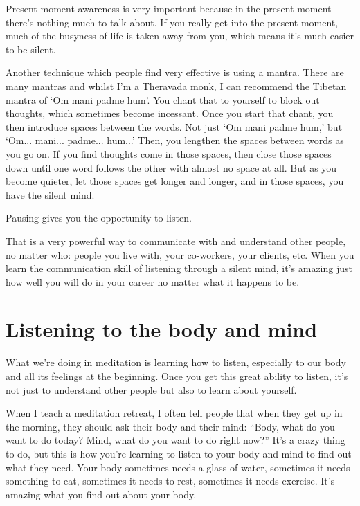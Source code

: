 \documentclass[12pt, openany]{book}
\newenvironment{aphorism}%
{%
\begin{center}\begin{itshape}
}%
{\end{itshape}\end{center}
}%
\begin{document}
Present moment awareness is very important because in the present moment there’s nothing much to talk about. If you really get into the present moment, much of the busyness of life is taken away from you, which means it’s much easier to be silent. 

Another technique which people find very effective is using a mantra. There are many mantras and whilst I’m a Theravada monk, I can recommend the Tibetan mantra of ‘Om mani padme hum’. You chant that to yourself to block out thoughts, which sometimes become incessant. Once you start that chant, you then introduce spaces between the words. Not just ‘Om mani padme hum,’ but ‘Om... mani... padme... hum...’ Then, you lengthen the spaces between words as you go on. If you find thoughts come in those spaces, then close those spaces down until one word follows the other with almost no space at all. But as you become quieter, let those spaces get longer and longer, and in those spaces, you have the silent mind. 

\begin{aphorism}
Pausing gives you the opportunity to listen.
\end{aphorism}

That is a very powerful way to communicate with and understand other people, no matter who: people you live with, your co-workers, your clients, etc. When you learn the communication skill of listening through a silent mind, it’s amazing just how well you will do in your career no matter what it happens to be. 

\section*{Listening to the body and mind}

What we’re doing in meditation is learning how to listen, especially to our body and all its feelings at the beginning. Once you get this great ability to listen, it’s not just to understand other people but also to learn about yourself. 

When I teach a meditation retreat, I often tell people that when they get up in the morning, they should ask their body and their mind: “Body, what do you want to do today? Mind, what do you want to do right now?” It’s a crazy thing to do, but this is how you’re learning to listen to your body and mind to find out what they need. Your body sometimes needs a glass of water, sometimes it needs something to eat, sometimes it needs to rest, sometimes it needs exercise. It’s amazing what you find out about your body. 
\end{document}
